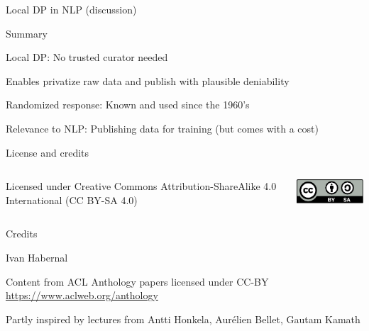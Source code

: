 \documentclass[12pt,aspectratio=169,handout]{beamer}
\begin{document}
\begin{frame}{Local DP in NLP (discussion)}

\end{frame}


\begin{frame}{Summary}

Local DP: No trusted curator needed

Enables privatize raw data and publish with plausible deniability

Randomized response: Known and used since the 1960's

Relevance to NLP: Publishing data for training (but comes with a cost)

\end{frame}




\begin{frame}{License and credits}

	\begin{columns}
		\begin{column}{0.7\textwidth}
			Licensed under Creative Commons Attribution-ShareAlike 4.0 International (CC BY-SA 4.0)
		\end{column}
		\begin{column}{0.2\textwidth}
			\includegraphics[width=0.9\linewidth]{img/cc-by-sa-icon.pdf}
		\end{column}
	\end{columns}
	
	\bigskip
	
	Credits
	
	\begin{scriptsize}
		
		Ivan Habernal
		
		Content from ACL Anthology papers licensed under CC-BY \url{https://www.aclweb.org/anthology}
		
		Partly inspired by lectures from Antti Honkela, Aurélien Bellet, Gautam Kamath
	
	\end{scriptsize}
	
\end{frame}
\end{document}
